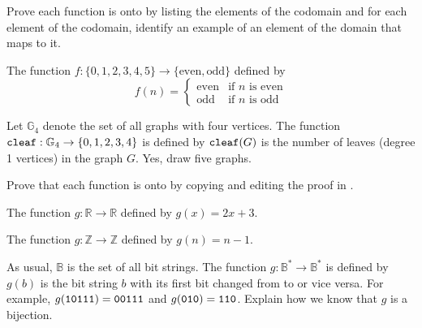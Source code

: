 \begin{exer}[\exerU] %
\label{exer_prove_onto_finite_discrete}
    Prove each function is onto by listing the elements of the codomain and for each element of the codomain, identify an example of an element of the domain that maps to it.
        \begin{apart}
            \item The function $f: \{0,1,2,3,4,5\} \to \{\text{even}, \text{odd}\}$ defined by 
                $$f(n) = \left\{ \begin{array} {cl}
                \text{even} & \text{if }n\text{ is even} \\
                \text{odd} & \text{if }n\text{ is odd}
                \end{array} \right.$$ 
            \item Let $\mathbb{G}_4$ denote the set of all graphs with four vertices. The function $\texttt{cleaf}: \mathbb{G}_4 \to \{0,1,2,3,4\}$ is defined by $\texttt{cleaf}(G)$ is the number of leaves (degree 1 vertices) in the graph $G$.  Yes, draw five graphs.
    \end{apart}
\end{exer}

\begin{exer}[\exerU] %
\label{exer_prove_onto_numbers}
    Prove that each function is onto by copying and editing the proof in .
    \begin{apart}      
        \item The function $g: \mathbb{R} \to \mathbb{R}$ defined by $g(x) = 2x + 3$.
        \item The function $g: \mathbb{Z} \to \mathbb{Z}$ defined by $g(n) = n-1$.
    \end{apart}
\end{exer}

\begin{exer}[\exerU] %
\label{exer_bijection}
     As usual, $\mathbb{B}$ is the set of all bit strings.  The function $g: \mathbb{B}^* \to \mathbb{B}^*$ is defined by $g(b)$ is the bit string $b$ with its first bit changed from  to  or vice versa.  For example, $g(\texttt{10111}) = \texttt{00111}$ and $g(\texttt{010}) = \texttt{110}$.  Explain how we know that $g$ is a bijection.
\end{exer}

